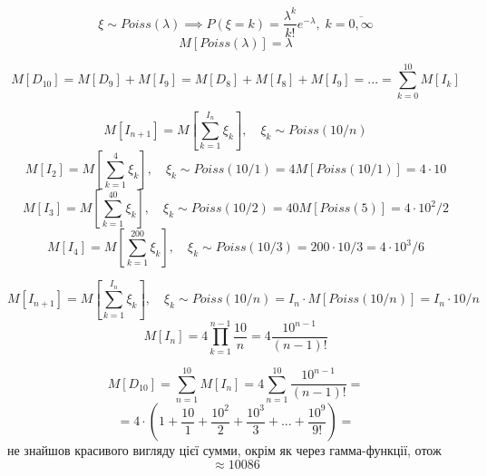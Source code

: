 \documentclass[11pt, a4paper]{article} %
\begin{document}
\begin{mdframed}[backgroundcolor=violet!15]
    $$\xi \sim Poiss(\lambda) \implies P(\xi=k) = \frac{\lambda^k}{k!}e^{-\lambda},\; k=\overline{0,\infty}$$
    $$M[Poiss(\lambda)] = \lambda$$
\end{mdframed}


$$M[D_{10}] = M[D_9] + M[I_9] = M[D_8] + M[I_8] + M[I_9] = ... = \sum_{k=0}^{10} M[I_k]$$

$$M[I_{n+1}] = M[\sum_{k=1}^{I_n}\xi_k],\quad \xi_k \sim Poiss(10/n)$$
$$M[I_2] = M[\sum_{k=1}^{4}\xi_k],\quad \xi_k \sim Poiss(10/1) = 4M[Poiss(10/1)] = 4 \cdot 10$$
$$M[I_3] = M[\sum_{k=1}^{40}\xi_k],\quad \xi_k \sim Poiss(10/2) = 40M[Poiss(5)] = 4 \cdot 10^2 / 2$$
$$M[I_4] = M[\sum_{k=1}^{200}\xi_k],\quad \xi_k \sim Poiss(10/3) = 200\cdot 10/3 = 4 \cdot 10^3 / 6$$

$$M[I_{n+1}] = M[\sum_{k=1}^{I_n}\xi_k],\quad \xi_k \sim Poiss(10/n) = I_n \cdot M[Poiss(10/n)] = I_n \cdot 10/n$$
$$M[I_{n}] = 4\prod_{k=1}^{n-1} \frac{10}{n} = 4\frac{10^{n-1}}{(n-1)!}$$

$$M[D_{10}] = \sum_{n=1}^{10} M[I_n] = 4 \sum_{n=1}^{10} \frac{10^{n-1}}{(n-1)!} = $$
$$= 4 \cdot \left(1 + \frac{10}{1} + \frac{10^2}{2} + \frac{10^3}{3} + ... + \frac{10^9}{9!}\right) = $$
не знайшов красивого вигляду цієї сумми, окрім як через гамма-функції, отож
$$\approx 10086$$
\end{document}
